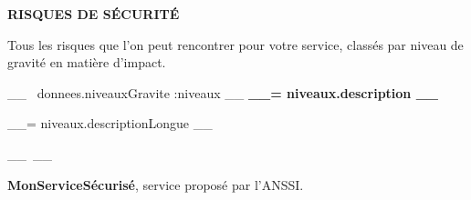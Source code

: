 \documentclass[9pt, a4paper]{article}
\begin{document}
  \textbf{RISQUES DE SÉCURITÉ}

  \textcolor{gris}{Tous les risques que l'on peut rencontrer pour votre service, classés par niveau de gravité en matière d'impact.}

  \vskip 0.5cm

  __~ donnees.niveauxGravite :niveaux __
    \textbf{__= niveaux.description __}

    \begin{tcolorbox}[colback=white, colframe=lisere, boxrule=1px]
        \textcolor{gris}{__= niveaux.descriptionLongue __}
    \end{tcolorbox}
  __~__

  \vskip 1cm

  \textcolor{bleu}{\textbf{MonServiceSécurisé}}, service proposé par l'ANSSI.
\end{document}
